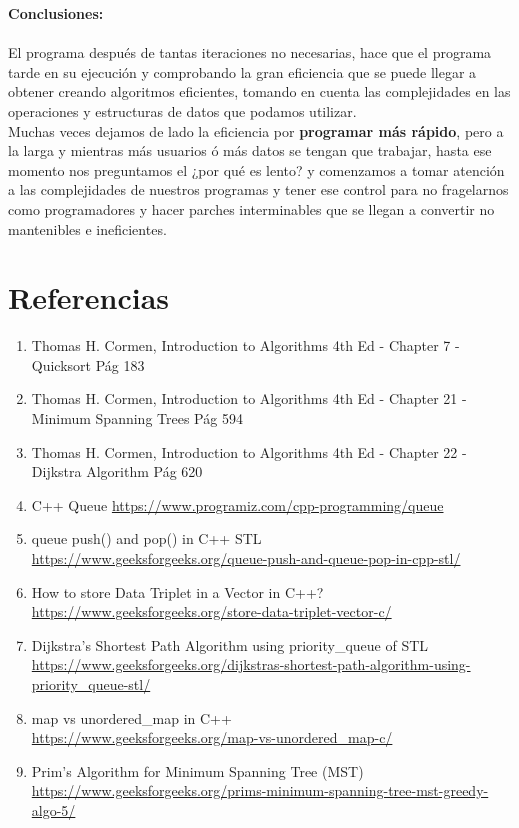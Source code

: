 \documentclass{article}
\begin{document}
  \textbf{Conclusiones:}\\\\

  El programa después de tantas iteraciones no necesarias, hace que el programa tarde en su ejecución y comprobando la gran eficiencia que se puede llegar a obtener creando algoritmos eficientes, tomando en cuenta las complejidades en las operaciones y estructuras de datos que podamos utilizar.\\

  Muchas veces dejamos de lado la eficiencia por \textbf{programar más rápido}, pero a la larga y mientras más usuarios ó más datos se tengan que trabajar, hasta ese momento nos preguntamos el ¿por qué es lento? y comenzamos a tomar atención a las complejidades de nuestros programas y tener ese control para no fragelarnos como programadores y hacer parches interminables que se llegan a convertir no mantenibles e ineficientes.

  \section{Referencias}

  \begin{enumerate}
  \item Thomas H. Cormen, Introduction to Algorithms 4th Ed - Chapter 7 - Quicksort Pág 183
  \item Thomas H. Cormen, Introduction to Algorithms 4th Ed - Chapter 21 - Minimum Spanning Trees Pág 594 
  \item Thomas H. Cormen, Introduction to Algorithms 4th Ed - Chapter 22 - Dijkstra Algorithm Pág 620
  \item C++ Queue \url{https://www.programiz.com/cpp-programming/queue}
  \item queue push() and pop() in C++ STL \\ \url{https://www.geeksforgeeks.org/queue-push-and-queue-pop-in-cpp-stl/}
  \item How to store Data Triplet in a Vector in C++? \\ \url{https://www.geeksforgeeks.org/store-data-triplet-vector-c/}
  \item Dijkstra’s Shortest Path Algorithm using priority\_queue of STL \\ \url{https://www.geeksforgeeks.org/dijkstras-shortest-path-algorithm-using-priority_queue-stl/}
  \item map vs unordered\_map in C++ \\ \url{https://www.geeksforgeeks.org/map-vs-unordered_map-c/}
  \item Prim’s Algorithm for Minimum Spanning Tree (MST) \\ \url{https://www.geeksforgeeks.org/prims-minimum-spanning-tree-mst-greedy-algo-5/}
  \end{enumerate}
\end{document}
